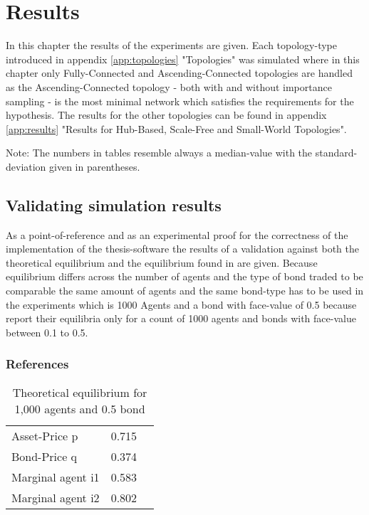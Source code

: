 \documentclass[Bachelorarbeit.tex]{subfiles}
\begin{document}
\graphicspath{{./figures/results/}}	%

\chapter{Results}
\label{ch:results}

In this chapter the results of the experiments are given. Each topology-type introduced in appendix \ref{app:topologies} "Topologies" was simulated where in this chapter only Fully-Connected and Ascending-Connected topologies are handled as the Ascending-Connected topology - both with and without importance sampling - is the most minimal network which satisfies the requirements for the hypothesis. The results for the other topologies can be found in appendix \ref{app:results} "Results for Hub-Based, Scale-Free and Small-World Topologies".

Note: The numbers in tables resemble always a median-value with the standard-deviation given in parentheses.

\section{Validating simulation results}
As  a point-of-reference and as an experimental proof for the correctness of the implementation of the thesis-software the results of a validation against both the theoretical equilibrium and the equilibrium found in \cite{Breuer2015} are given. Because equilibrium differs across the number of agents and the type of bond traded to be comparable the same amount of agents and the same bond-type has to be used in the experiments which is 1000 Agents and a bond with face-value of 0.5 because \cite{Breuer2015} report their equilibria only for a count of 1000 agents and bonds with face-value between 0.1 to 0.5.

\subsection{References}

\begin{table}[H]
	\centering
	\caption{Theoretical equilibrium for 1,000 agents and 0.5 bond}
	\begin{tabular} { l c r }
		\hline
		Asset-Price p & 0.715 \\
		Bond-Price q & 0.374 \\
		Marginal agent i1 & 0.583 \\
		Marginal agent i2 & 0.802 \\
		\hline
	\end{tabular}
	\label{tab:equilibrium_THEORY_1000}
\end{table}
\end{document}
